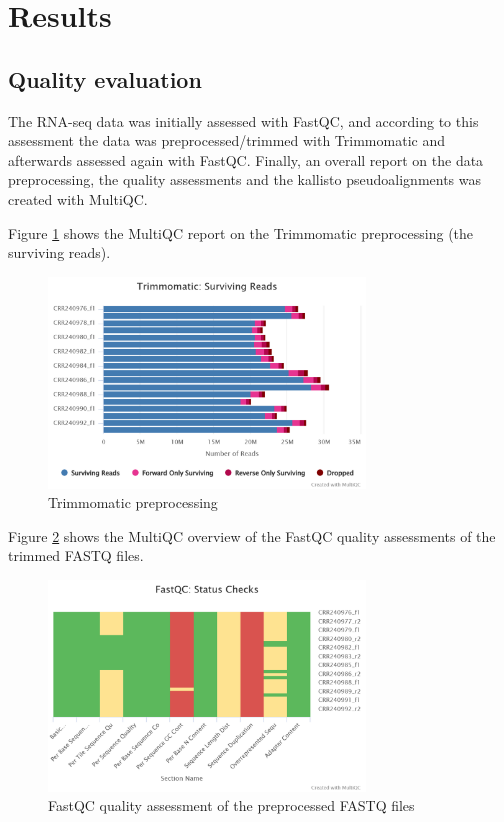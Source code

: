 \section{Results}

\subsection{Quality evaluation}

The RNA-seq data was initially assessed with FastQC, and according to this assessment the data was preprocessed/trimmed with Trimmomatic and afterwards assessed again with FastQC. Finally, an overall report on the data preprocessing, the quality assessments and the kallisto pseudoalignments was created with MultiQC.

Figure \ref{fig:0.1-MultiQC_FastQC_status_checks} shows the MultiQC report on the Trimmomatic preprocessing (the surviving reads).

\begin{figure}[htbp]
    \caption{Trimmomatic preprocessing}
    \label{fig:0.1-MultiQC_FastQC_status_checks}
    \includegraphics[width=0.75\textwidth]{../../results/multiqc/Plot-Exports/trimmomatic-surviving_reads}
\end{figure}

Figure \ref{fig:0.2-MultiQC_FastQC_status_checks} shows the MultiQC overview of the FastQC quality assessments of the trimmed FASTQ files.

\begin{figure}[htbp]
    \caption{FastQC quality assessment of the preprocessed FASTQ files}
    \label{fig:0.2-MultiQC_FastQC_status_checks}
    \includegraphics[width=0.75\textwidth]{../../results/multiqc/Plot-Exports/fastqc-status-check-heatmap}
\end{figure}

